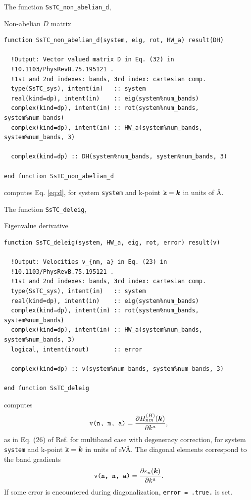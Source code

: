 \documentclass[10pt,a4paper]{article}
\begin{document}
The function \verb|SsTC_non_abelian_d|,
\begin{codebox}{Non-abelian $D$ matrix}
\begin{lstlisting}[caption={Interface of ``D matrix".},captionpos=b]
function SsTC_non_abelian_d(system, eig, rot, HW_a) result(DH)

  !Output: Vector valued matrix D in Eq. (32) in
  !10.1103/PhysRevB.75.195121 .
  !1st and 2nd indexes: bands, 3rd index: cartesian comp.
  type(SsTC_sys), intent(in)   :: system
  real(kind=dp), intent(in)    :: eig(system%num_bands)
  complex(kind=dp), intent(in) :: rot(system%num_bands, system%num_bands)
  complex(kind=dp), intent(in) :: HW_a(system%num_bands, system%num_bands, 3)

  complex(kind=dp) :: DH(system%num_bands, system%num_bands, 3)
  
end function SsTC_non_abelian_d
\end{lstlisting}
\end{codebox}
computes Eq. \eqref{eq:d}, for system \verb|system| and k-point $\verb|k| = \bm{k}$ in units of \r{A}.

The function \verb|SsTC_deleig|,
\begin{codebox}{Eigenvalue derivative}
\begin{lstlisting}[caption={Interface of ``Derivative of eigenvalues".},captionpos=b]
function SsTC_deleig(system, HW_a, eig, rot, error) result(v)

  !Output: Velocities v_{nm, a} in Eq. (23) in
  !10.1103/PhysRevB.75.195121 .
  !1st and 2nd indexes: bands, 3rd index: cartesian comp.
  type(SsTC_sys), intent(in)   :: system
  real(kind=dp), intent(in)    :: eig(system%num_bands)
  complex(kind=dp), intent(in) :: rot(system%num_bands, system%num_bands)
  complex(kind=dp), intent(in) :: HW_a(system%num_bands, system%num_bands, 3)
  logical, intent(inout)       :: error

  complex(kind=dp) :: v(system%num_bands, system%num_bands, 3)
  
end function SsTC_deleig
\end{lstlisting}
\end{codebox}
computes 
\begin{equation}
\verb|v(n, m, a)| = \frac{\partial H_{nm}^{(H)}(\bm{k})}{\partial k^a},
\end{equation}
as in Eq. (26) of Ref. \cite{yatesSpectralFermiSurface2007} for multiband case with degeneracy correction, for system \verb|system| and k-point $\verb|k| = \bm{k}$ in units of eV\r{A}. The diagonal elements correspond to the band gradients
\begin{equation}
\verb|v(n, n, a)| = \frac{\partial\varepsilon_n(\bm{k})}{\partial k^a}.
\end{equation}
If some error is encountered during diagonalization, \verb|error = .true.| is set.
\end{document}

